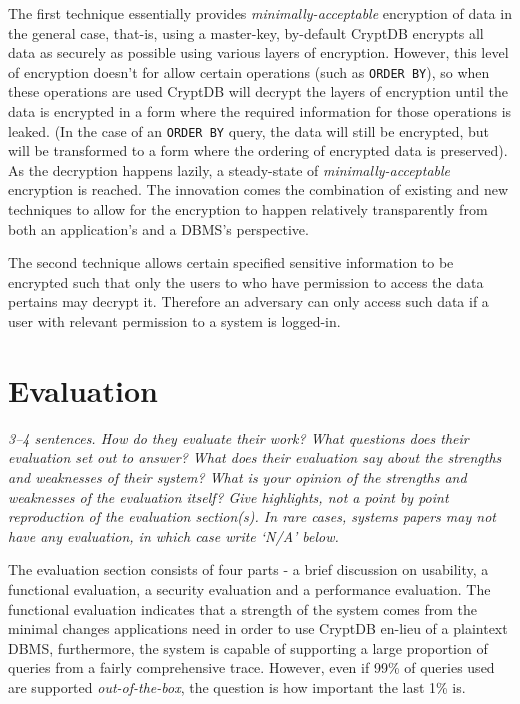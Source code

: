 \documentclass[11pt]{article}
\begin{document}
The first technique essentially provides \textit{minimally-acceptable}
encryption of data in the general case, that-is, using a master-key, by-default
CryptDB encrypts all data as securely as possible using various layers of
encryption. However, this level of encryption doesn't for allow certain
operations (such as \texttt{ORDER BY}), so when these operations are used
CryptDB will decrypt the layers of encryption until the data is encrypted in a
form where the required information for those operations is leaked. (In the
case of an \texttt{ORDER BY} query, the data will still be encrypted, but will
be transformed to a form where the ordering of encrypted data is preserved). As
the decryption happens lazily, a steady-state of \textit{minimally-acceptable}
encryption is reached. The innovation comes the combination of existing and new
techniques to allow for the encryption to happen relatively transparently from
both an application's and a DBMS's perspective.

The second technique allows certain specified sensitive information to be
encrypted such that only the users to who have permission to access the data
pertains may decrypt it. Therefore an adversary can only access such data if a
user with relevant permission to a system is logged-in.


\section*{Evaluation}

\textsl{3--4 sentences. How do they evaluate their work? What questions does
their evaluation set out to answer? What does their evaluation say about the
strengths and weaknesses of their system? What is your opinion of the strengths
and weaknesses of the evaluation itself? Give highlights, not a point by point
reproduction of the evaluation section(s). In rare cases, systems papers may
not have any evaluation, in which case write `N/A' below.}

The evaluation section consists of four parts - a brief discussion on
usability, a functional evaluation, a security evaluation and a performance
evaluation. The functional evaluation indicates that a strength of the system
comes from the minimal changes applications need in order to use CryptDB
en-lieu of a plaintext DBMS, furthermore, the system is capable of supporting a
large proportion of queries from a fairly comprehensive trace. However, even if
99\% of queries used are supported \textit{out-of-the-box}, the question is how
important the last 1\% is.
\end{document}
